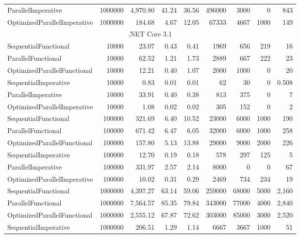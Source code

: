 \begin{table}
\begin{tabularx}{\linewidth}{Xrrrrrrrr}
ParallelImperative	&	1000000	&	4,970.80	&	41.24	&	36.56	&	496000	&	3000	&	0	&	843	\\
OptimizedParallelImperative	&	1000000	&	184.68	&	4.67	&	12.05	&	67333	&	4667	&	1000	&	149	\\
      \midrule
			\multicolumn{9}{c}{.NET Core 3.1} \\ 
			\midrule 
SequentialFunctional	&	10000	&	23.07	&	0.43	&	0.41	&	1969	&	656	&	219	&	16	\\
ParallelFunctional	&	10000	&	62.52	&	1.21	&	1.73	&	2889	&	667	&	222	&	23	\\
OptimizedParallelFunctional	&	10000	&	12.21	&	0.40	&	1.07	&	2000	&	1000	&	0	&	20	\\
SequentialImperative	&	10000	&	0.83	&	0.01	&	0.01	&	62	&	30	&	0	&	0.508	\\
ParallelImperative	&	10000	&	33.91	&	0.40	&	0.38	&	813	&	375	&	0	&	7	\\
OptimizedParallelImperative	&	10000	&	1.08	&	0.02	&	0.02	&	305	&	152	&	0	&	2	\\
SequentialFunctional	&	100000	&	321.69	&	6.40	&	10.52	&	23000	&	6000	&	1000	&	190	\\
ParallelFunctional	&	100000	&	671.42	&	6.47	&	6.05	&	32000	&	6000	&	1000	&	258	\\
OptimizedParallelFunctional	&	100000	&	157.80	&	5.13	&	13.88	&	29000	&	9000	&	2000	&	226	\\
SequentialImperative	&	100000	&	12.70	&	0.19	&	0.18	&	578	&	297	&	125	&	5	\\
ParallelImperative	&	100000	&	331.97	&	2.57	&	2.14	&	8000	&	0	&	0	&	67	\\
OptimizedParallelImperative	&	100000	&	10.02	&	0.31	&	0.29	&	2469	&	734	&	234	&	19	\\
SequentialFunctional	&	1000000	&	4,397.27	&	63.14	&	59.06	&	259000	&	68000	&	5000	&	2,160	\\
ParallelFunctional	&	1000000	&	7,564.57	&	85.35	&	79.84	&	343000	&	77000	&	4000	&	2,840	\\
OptimizedParallelFunctional	&	1000000	&	2,555.12	&	67.87	&	72.62	&	303000	&	85000	&	3000	&	2,520	\\
SequentialImperative	&	1000000	&	206.51	&	1.29	&	1.14	&	6667	&	3667	&	1000	&	51	\\

			\bottomrule
    \end{tabularx}
\end{table}

\clearpage
